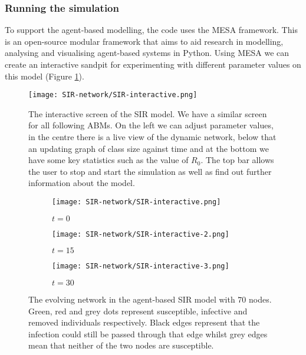 \subsubsection{Running the simulation}
To support the agent-based modelling, the code uses the MESA framework. This is an open-source modular framework that aims to aid research in modelling, analysing and visualising agent-based systems in Python\cite{mesa-github}. Using MESA we can create an interactive sandpit for experimenting with different parameter values on this model (Figure \ref{fig:SIR-interactive}).
\begin{figure}[h]
	\centering
	\texttt{[image: SIR-network/SIR-interactive.png]}
	\caption{The interactive screen of the SIR model. We have a similar screen for all following ABMs. On the left we can adjust parameter values, in the centre there is a live view of the dynamic network, below that an updating graph of class size against time and at the bottom we have some key statistics such as the value of $R_0$. The top bar allows the user to stop and start the simulation as well as find out further information about the model.}
	\label{fig:SIR-interactive}
\end{figure}
\begin{figure}
	\centering
	\begin{subfigure}{.3\textwidth}
		\centering
		\texttt{[image: SIR-network/SIR-interactive.png]}
		\caption{$t=0$}
		\label{fig:SIR-network-1}
	\end{subfigure}%
\begin{subfigure}{.3\textwidth}
	\centering
	\texttt{[image: SIR-network/SIR-interactive-2.png]}
	\caption{$t=15$}
	\label{fig:SIR-network-2}
\end{subfigure}%
	\begin{subfigure}{.3\textwidth}
		\centering
		\texttt{[image: SIR-network/SIR-interactive-3.png]}
		\caption{$t=30$}
		\label{fig:SIR-network-3}
	\end{subfigure}
	\caption{The evolving network in the agent-based SIR model with $70$ nodes. Green, red and grey dots represent susceptible, infective and removed individuals respectively. Black edges represent that the infection could still be passed through that edge whilst grey edges mean that neither of the two nodes are susceptible.}
	\label{fig:SIR-network-run}
\end{figure}
